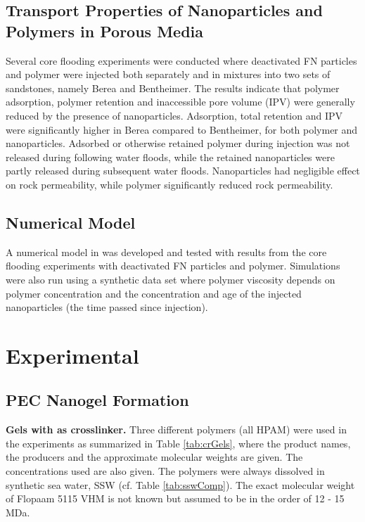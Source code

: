 \documentclass[journal = enfuem, manuscript =  article]{achemso}
\begin{document}
\subsection{Transport Properties of Nanoparticles and Polymers in Porous Media}
Several core flooding experiments were conducted where deactivated FN particles and polymer were injected both separately and in mixtures into two sets of sandstones, namely Berea and Bentheimer. The results indicate that polymer adsorption, polymer retention and inaccessible pore volume  (IPV) were generally reduced by the presence of nanoparticles. Adsorption, total retention and IPV were significantly higher in Berea compared to Bentheimer, for both polymer and nanoparticles. Adsorbed or otherwise retained polymer during injection was not released during following water floods, while the retained nanoparticles were partly released during subsequent water floods. Nanoparticles had negligible effect on rock permeability, while polymer significantly reduced rock permeability.

\subsection{Numerical Model}
A numerical model in was developed and tested with results from the core flooding experiments with deactivated FN particles and polymer. Simulations were also run using a synthetic data set where polymer viscosity depends on polymer concentration and the concentration and age of the injected nanoparticles (the time passed since injection).

\section{Experimental}
\subsection{PEC Nanogel Formation}
\textbf{Gels with  as crosslinker.}
Three different polymers (all HPAM) were used in the experiments as summarized in Table \ref{tab:crGels}, where the product names, the producers and the approximate molecular weights are given. The concentrations used are also given. The polymers were always dissolved in synthetic sea water, SSW (cf. Table \ref{tab:sswComp}). The exact molecular weight of Flopaam 5115 VHM is not known but assumed to be in the order of 12 - 15 MDa.
\end{document}
